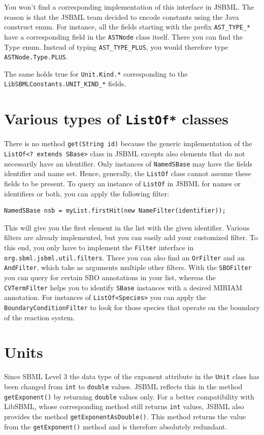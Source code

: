 \documentclass[
  letterpaper,
  12pt,
  headsepline,
  pointlessnumbers,
  tablecaptionabove,
  headinclude,
  appendixprefix,
  idxtotoc,
  bibtotoc
]{scrartcl}
\begin{document}
You won't find a corresponding implementation of this interface in 
JSBML. The reason is that the JSBML team decided to encode constants using the
Java construct enum. For instance, all the fields starting with the
prefix \verb!AST_TYPE_*! have a corresponding field in the \verb!ASTNode! class
itself. There you can find the Type enum. Instead of typing
\verb!AST_TYPE_PLUS!, you would therefore type \verb!ASTNode.Type.PLUS!.

The same holds true for \verb!Unit.Kind.*! corresponding to the 
\verb!LibSBMLConstants.UNIT_KIND_*! fields.


\section{Various types of \texttt{ListOf*} classes}

There is no method \verb!get(String id)! because the generic implementation of 
the \verb!ListOf<? extends SBase>! class in JSBML excepts also elements that do 
not necessarily have an identifier. Only instances of \verb!NamedSBase! may have
the fields identifier and name set. Hence, generally, the \verb!ListOf! class 
cannot assume these fields to be present. To query an instance of \verb!ListOf! 
in JSBML for names or identifiers or both, you can apply the following 
filter:
\begin{verbatim}
NamedSBase nsb = myList.firstHit(new NameFilter(identifier));
\end{verbatim}
This will give you the first element in the list with the given identifier.
Various filters are already implemented, but you can easily add your 
customized filter. To this end, you only have to implement the \verb!Filter! 
interface in \verb!org.sbml.jsbml.util.filters!. There you can also find an
\verb!OrFilter! and an \verb!AndFilter!, which take as arguments multiple other
filters. With the \verb!SBOFilter! you can query for certain SBO annotations in
your list, whereas the \verb!CVTermFilter! helps you to identify \verb!SBase!
instances with a desired MIRIAM annotation. For instances of
\verb!ListOf<Species>! you can apply the \verb!BoundaryConditionFilter! to look
for those species that operate on the boundary of the reaction system.


\section{Units}

Since SBML Level 3 the data type of the exponent attribute in the \verb!Unit! class
has been changed from \verb!int! to \verb!double! values. JSBML reflects this in
the method \verb!getExponent()! by returning \verb!double! values only. For a
better compatibility with LibSBML, whose corresponding method still returns 
\verb!int! values, JSBML also provides the method \verb!getExponentAsDouble()!.
This method returns the value from the \verb!getExponent()! method and is
therefore absolutely redundant.
\end{document}
